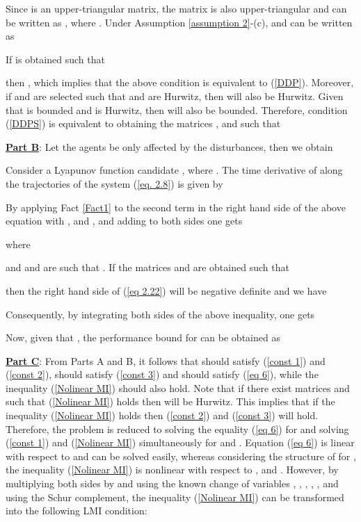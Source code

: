 \documentclass[12pt,draftcls,onecolumn]{IEEEtran}
\begin{document}
Since  is an upper-triangular matrix, the matrix  is also upper-triangular and can be written  as 
, where . Under Assumption \ref{assumption 2}-(c),  and  can be written as 
\par
If  is obtained such that 

then  , which implies that the above condition is equivalent to (\ref{DDP}). Moreover, if  and  are selected such that  and  are Hurwitz, then  will also be Hurwitz. Given that  is bounded and  is Hurwitz, then  will also be bounded. Therefore, condition (\ref{DDPS}) is equivalent  to  obtaining the matrices ,  and   such that

\underline{\textbf{Part B}}: Let the agents be only affected by the disturbances, then  we obtain

 Consider a Lyapunov function candidate  , where . The time derivative of  along the trajectories of the system (\ref{eq. 2.8}) is given by

By applying Fact \ref{Fact1} to the second term in the right hand side of the above equation with ,  and , and adding  to both sides one gets 

where
 
and  and  are such that .
If the matrices  and  are obtained such that 

 then  the right hand side of (\ref{eq 2.22}) will be negative definite and we have 
\par
Consequently, by integrating both sides of the above inequality, one gets

Now, given that , the  performance  bound for   can be obtained as 
  \par
\underline{\textbf{Part C}}: From Parts A and B, it follows that  should satisfy (\ref{const 1}) and (\ref{const 2}),   should satisfy (\ref{const 3}) and  should  satisfy (\ref{eq 6}), while the inequality (\ref{Nolinear MI}) should also hold. Note that if there exist matrices  and  such that (\ref{Nolinear MI}) holds then  will be Hurwitz. This implies that if the inequality (\ref{Nolinear MI}) holds then  (\ref{const 2}) and (\ref{const 3}) will hold. Therefore, the problem is reduced to solving the equality (\ref{eq 6}) for   and solving (\ref{const 1})  and (\ref{Nolinear MI}) simultaneously for   and . Equation (\ref{eq 6}) is linear with respect to  and can be solved easily,
whereas considering the structure of  for , the inequality (\ref{Nolinear MI}) is nonlinear with respect to ,  and . However, by multiplying both sides by  and using the known change of variables , , , , ,  and using the Schur complement, the  inequality (\ref{Nolinear MI}) can be transformed into the following LMI condition:
\end{document}
